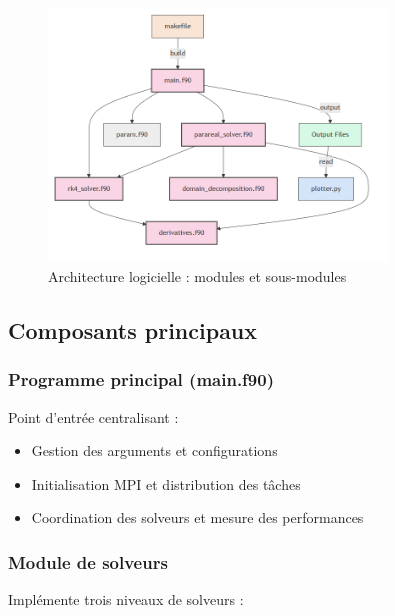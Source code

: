 \begin{figure}[H]
    \centering
    \includegraphics[width=0.8\textwidth]{code/figure.png}
    \caption{Architecture logicielle : modules et sous-modules}
    \label{fig:architecture}
\end{figure}

\subsection{Composants principaux}

\subsubsection{Programme principal (main.f90)}
Point d'entrée centralisant :
\begin{itemize}
    \item Gestion des arguments et configurations
    \item Initialisation MPI et distribution des tâches
    \item Coordination des solveurs et mesure des performances
\end{itemize}

\subsubsection{Module de solveurs}
Implémente trois niveaux de solveurs :

